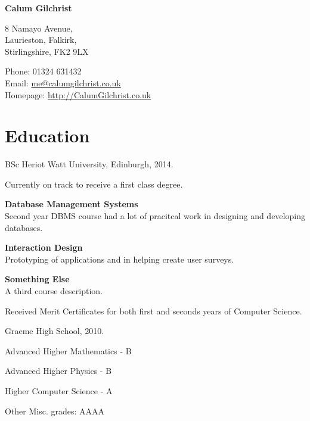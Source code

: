 \documentclass[11pt,a4paper]{article}
\def\name{Calum Gilchrist}
\renewenvironment{itemize}{
  \begin{list}{}{
    \setlength{\leftmargin}{1.5em}
    \setlength{\itemsep}{0.25em}
    \setlength{\parskip}{0pt}
    \setlength{\parsep}{0.25em}
    \renewcommand{\labelitemi}{$\bullet$}
  }
}{
  \end{list}
}
\begin{document}

\centerline{\huge \bf \name}

\bigskip

\begin{minipage}[t]{0.495\textwidth}
  8 Namayo Avenue, \\
  Laurieston, Falkirk, \\
  Stirlingshire, FK2 9LX
\end{minipage}
\begin{minipage}[t]{0.495\textwidth}
  Phone: 01324 631432 \\
  Email: \href{mailto:me@calumgilchrist.co.uk}{me@calumgilchrist.co.uk} \\
  Homepage: \href{http://calumgilchrist.co.uk/}{http://CalumGilchrist.co.uk}
\end{minipage}

\section*{Education}

\begin{itemize}
  \item BSc Heriot Watt University, Edinburgh, 2014.

    Currently on track to receive a first class degree.

    \begin{itemize}
        \item \textbf{Database Management Systems} \\
            Second year DBMS course had a lot of pracitcal work in designing and developing databases.
        \item \textbf{Interaction Design} \\
            Prototyping of applications and in helping create user surveys.
        \item \textbf{Something Else} \\
            A third course description.
    \end{itemize}

    Received Merit Certificates for both first and seconds years of Computer Science.

  \item Graeme High School, 2010.

    \begin{itemize}
        \item Advanced Higher Mathematics - B
        \item Advanced Higher Physics - B
        \item Higher Computer Science - A
        \item Other Misc. grades: AAAA
    \end{itemize}
\end{itemize}
\end{document}
